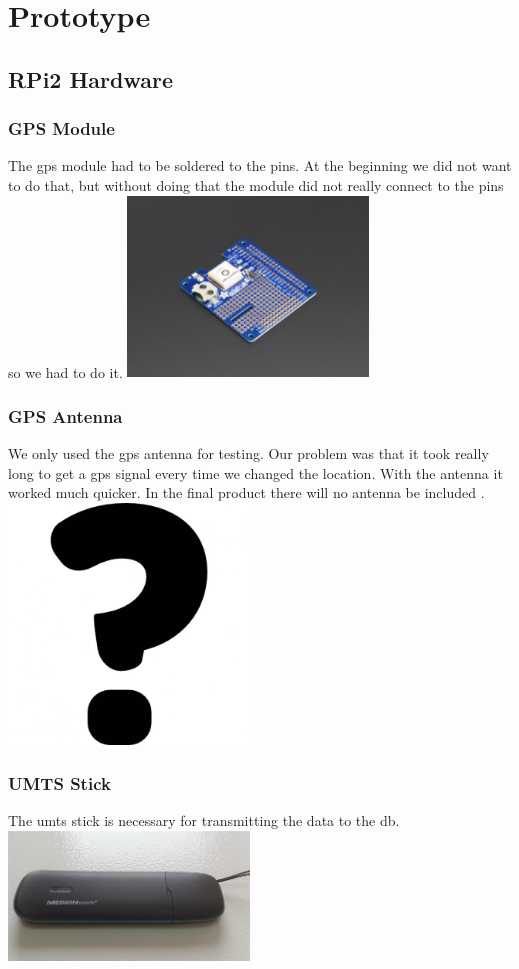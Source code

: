 \chapter{Prototype}
\section{RPi2 Hardware}
\subsection{GPS Module}
    
The \gls{gps} module had to be soldered to the pins. At the beginning we did not want to do that, but without doing that the module did not really connect to the pins so we had to do it.\newline
\includegraphics[width=0.48\textwidth]{bilder/GPS}
\subsection{GPS Antenna}
We only used the \gls{gps} antenna for testing. Our problem was that it took really long to get a \gls{gps} signal every time we changed the location. With the antenna it worked much quicker. In the final product there will no antenna be included .\newline 
\includegraphics[width=0.48\textwidth]{bilder/Antenna}
\subsection{UMTS Stick}
The \gls{umts} stick is necessary for transmitting the data to the \gls{db}.\newline
\includegraphics[width=0.48\textwidth]{bilder/Medion_3}
